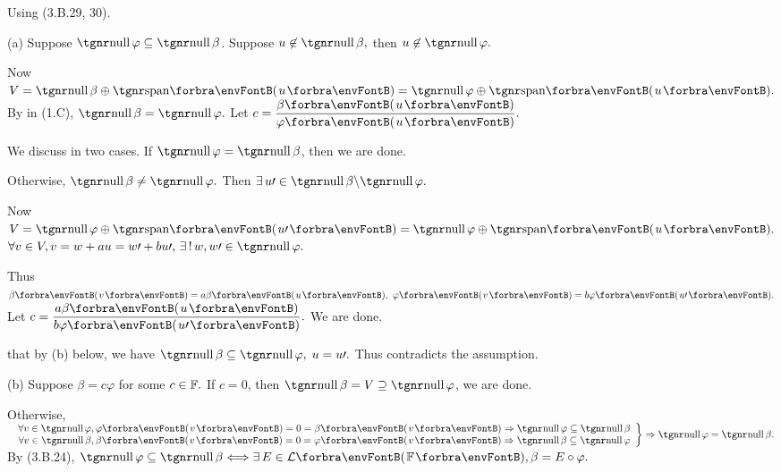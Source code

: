 \documentclass[a4paper, 11pt, UTF8]{article}
\begin{document}
\begin{large}
\par\quad
Using (3.B.29, 30).\par\quad
(a) Suppose $\null \varphi \subseteq\null\beta$. Suppose $u\not\in\null\beta,$ then $u\not\in\null\varphi.$\vspace{-4pt}\par\quad\Ha
Now $V=\null\beta\oplus\Span{u}=\null\varphi\oplus\Span{u}.$ By \TIPS in (1.C), $\null\beta=\null\varphi.$ \;Let $c=\displaystyle\frac{\beta\Par{u}}{\varphi\Par{u}}.$\vspace{2pt}\par\quad\Ha
\Or We discuss in two cases. If $\null\varphi=\null\beta$, then we are done.\par\quad\Ha
Otherwise, $\null\beta\neq\null\varphi.$ Then $\exists\,u\apostrophe\in\null\beta\backslash\null\varphi.$\par\quad\Ha
Now $V=\null\varphi\oplus\Span{u\apostrophe}=\null\varphi\oplus\Span{u}.$ $\forall v \in V, v=w+au=w\apostrophe+bu\apostrophe,\,\exists\,!\,w, w\apostrophe\in\null\varphi.$\vspace{5pt}\par\quad\Ha
Thus $\beta\Par{v}=a\beta\Par{u},\,\,\varphi\Par{v} = b\varphi\Par{u\apostrophe}.$ Let $c=\displaystyle\frac{a\beta\Par{u}}{b\varphi\Par{u\apostrophe}}.$ We are done.\vspace{6pt}\par\quad\Ha
\NOTICE that by (b) below, we have $\null\beta\subseteq\null\varphi,\;u=u\apostrophe.$ Thus contradicts the assumption.\vspace{6pt}\par\quad
(b) Suppose $\beta=c\varphi$ for some $c\in{\mathbb{F}}.$ If $c=0$, then $\null \beta=V\supseteq\null\varphi$, we are done.\vspace{2pt}\par\quad\Hb
Otherwise,$\MathRightBrace{r}{$
	$\forall v\in\null\varphi,\varphi\Par{v}=0=\beta\Par{v} \Rightarrow\null\varphi\subseteq\null\beta\\
	\forall v \in\null\beta,\beta\Par{v}=0=\varphi\Par{v}\Rightarrow\null \beta\subseteq\null\varphi}\Rightarrow\null\varphi=\null\beta.$\PfEnd\vspace{10pt}\quad
\Or By (3.B.24), $\null\varphi\subseteq\null\beta\Longleftrightarrow\exists\,E\in\Lm{\Fbb},\beta=E\circ\varphi.$ \par\quad

\end{large}
\end{document}
